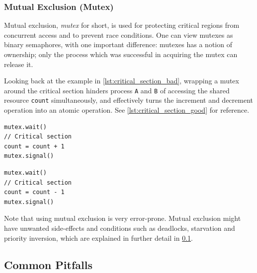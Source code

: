 \subsubsection{Mutual Exclusion (Mutex)}


Mutual exclusion, \textit{mutex} for short, is used for protecting critical regions from concurrent access and to prevent race conditions. One can view mutexes as binary semaphores, with one important difference: mutexes has a notion of ownership; only the process which was successful in acquiring the mutex can release it. 

Looking back at the example in \cref{lst:critical_section_bad}, wrapping a mutex around the critical section hinders process \texttt{A} and \texttt{B} of accessing the shared resource \texttt{count} simultaneously, and effectively turns the increment and decrement operation into an atomic operation. See \cref{lst:critical_section_good} for reference.

\begin{lstfloat}
\noindent\begin{minipage}{0.45\textwidth}
\begin{lstlisting}[title={Process A},style={CustomC},frame={},xleftmargin={4em}]
mutex.wait()
// Critical section
count = count + 1
mutex.signal()
\end{lstlisting}
\end{minipage}
\begin{minipage}{0.45\textwidth}
\begin{lstlisting}[title={Process B},style={CustomC},frame={},xleftmargin={4em}]
mutex.wait()
// Critical section
count = count - 1
mutex.signal()
\end{lstlisting}
\end{minipage}
\label{lst:critical_section_good}
\end{lstfloat}

Note that using mutual exclusion is very error\hyp{}prone. Mutual exclusion might have unwanted side\hyp{}effects and conditions such as deadlocks, starvation and priority inversion, which are explained in further detail in \cref{subsec:common_pitfals}.


\subsection{Common Pitfalls}
\label{subsec:common_pitfals}


